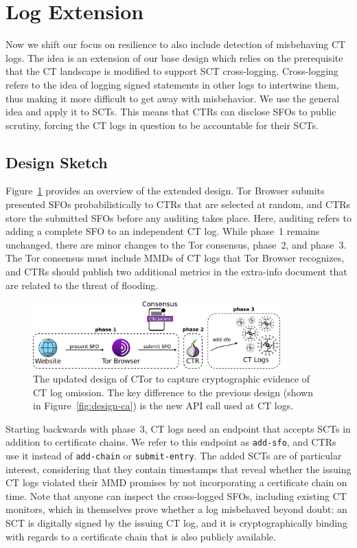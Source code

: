 \section{Log Extension} \label{sec:log}
Now we shift our focus on resilience to also include detection of misbehaving CT
logs.  The idea is an extension of our base design which relies on the
prerequisite that the CT landscape is modified to support SCT cross-logging.
Cross-logging refers to the idea of logging signed statements in other logs to
intertwine them, thus making it more difficult to get away with misbehavior.  We
use the general idea and apply it to SCTs.  This means that CTRs can disclose
SFOs to public scrutiny, forcing the CT logs in question to be accountable for
their SCTs.

\subsection{Design Sketch}
Figure~\ref{fig:ext-log} provides an overview of the extended design.  Tor
Browser submits presented SFOs probabilistically to CTRs that are selected
at random, and CTRs store the submitted SFOs before any auditing takes place.
Here, auditing refers to adding a complete SFO to an independent CT log.  While
phase~1 remains unchanged, there are minor changes to the Tor consensus,
phase~2, and phase~3.  The Tor consensus must include MMDs of CT logs that
Tor Browser recognizes, and CTRs should publish two additional metrics in the
extra-info document that are related to the threat of flooding.

\begin{figure}
    \centering
    \includegraphics[width=0.85\textwidth]{img/design-log}
	\caption{The updated design of CTor to capture cryptographic evidence of CT
	log omission. The key difference to the previous design (shown in
	Figure~\ref{fig:design-ca}) is the new API call used at CT logs.}
    \label{fig:ext-log}
\end{figure}

Starting backwards with phase~3, CT logs need an endpoint that accepts SCTs in
addition to certificate chains.  We refer to this endpoint as
\texttt{add-sfo}, and CTRs use it instead of \texttt{add-chain} or
\texttt{submit-entry}.  The added SCTs are of particular interest,
considering that they contain timestamps that reveal whether the issuing CT logs
violated their MMD promises by not incorporating a certificate chain on time.
Note that anyone can inspect the cross-logged SFOs, including existing CT
monitors, which in themselves prove whether a log misbehaved beyond doubt:
	an SCT is digitally signed by the issuing CT log, and
	it is cryptographically binding with regards to a certificate chain that
		is also publicly available.

